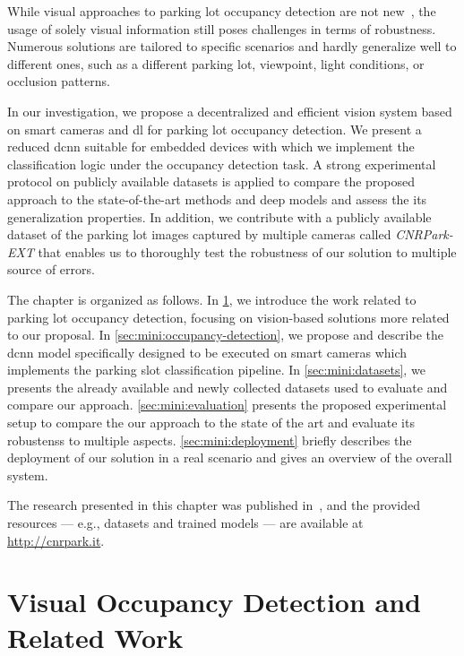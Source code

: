 While visual approaches to parking lot occupancy detection are not new~\cite{dan2002parking,wu2007robust,del2015vacant,de2015pklot}, the usage of solely visual information still poses challenges in terms of robustness.
Numerous solutions are tailored to specific scenarios and hardly generalize well to different ones, such as a different parking lot, viewpoint, light conditions, or occlusion patterns.

In our investigation, we propose a decentralized and efficient vision system based on smart cameras and \gls{dl} for parking lot occupancy detection.
We present a reduced \gls{dcnn} suitable for embedded devices with which we implement the classification logic under the occupancy detection task.
A strong experimental protocol on publicly available datasets is applied to compare the proposed approach to the state-of-the-art methods and deep models and assess the its generalization properties.
In addition, we contribute with a publicly available dataset of the parking lot images captured by multiple cameras called \emph{CNRPark-EXT} that enables us to thoroughly test the robustness of our solution to multiple source of errors.

The chapter is organized as follows.
In \ref{sec:mini:related-work}, we introduce the work related to parking lot occupancy detection, focusing on vision-based solutions more related to our proposal.
In \ref{sec:mini:occupancy-detection}, we propose and describe the \gls{dcnn} model specifically designed to be executed on smart cameras which implements the parking slot classification pipeline.
In \ref{sec:mini:datasets}, we presents the already available and newly collected datasets used to evaluate and compare our approach.
\ref{sec:mini:evaluation} presents the proposed experimental setup to compare the our approach to the state of the art and evaluate its robustenss to multiple aspects.
\ref{sec:mini:deployment} briefly describes the deployment of our solution in a real scenario and gives an overview of the overall system.

The research presented in this chapter was published in~\cite{amato2016car,amato2017deep}, and the provided resources --- e.g., datasets and trained models --- are available at \url{http://cnrpark.it}.

\section{Visual Occupancy Detection and Related Work}
\label{sec:mini:related-work}

